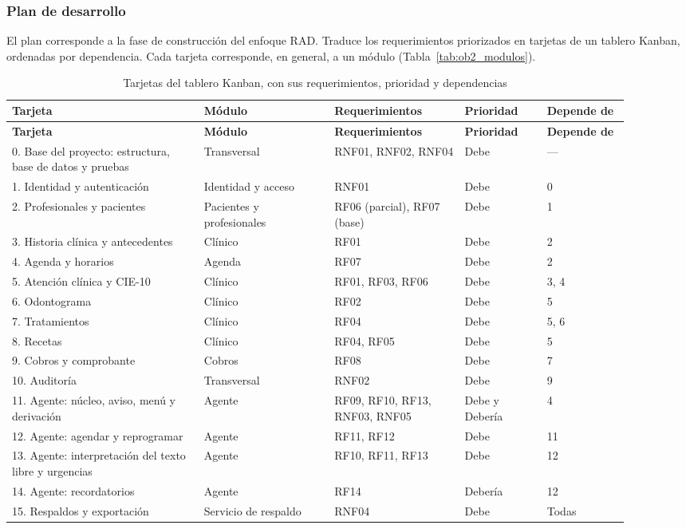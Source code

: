 \subsubsection{Plan de desarrollo}

El plan corresponde a la fase de construcción del enfoque RAD. Traduce los requerimientos priorizados en tarjetas de un tablero Kanban, ordenadas por dependencia. Cada tarjeta corresponde, en general, a un módulo (Tabla~\ref{tab:ob2_modulos}).

\begingroup
\fontsize{9}{11}\selectfont
\renewcommand{\arraystretch}{1.2}
\setlength{\LTpre}{0pt}\setlength{\LTpost}{6pt}
\setlength{\tabcolsep}{4pt}
\begin{longtable}{|p{0.28\linewidth}|p{0.19\linewidth}|p{0.19\linewidth}|p{0.12\linewidth}|p{0.12\linewidth}|}
\caption{Tarjetas del tablero Kanban, con sus requerimientos, prioridad y dependencias}
\label{tab:ob2_tarjetas} \\
\hline
\textbf{Tarjeta} & \textbf{Módulo} & \textbf{Requerimientos} & \textbf{Prioridad} & \textbf{Depende de} \\ \hline
\endfirsthead
\hline
\textbf{Tarjeta} & \textbf{Módulo} & \textbf{Requerimientos} & \textbf{Prioridad} & \textbf{Depende de} \\ \hline
\endhead

0. Base del proyecto: estructura, base de datos y pruebas & Transversal & RNF01, RNF02, RNF04 & Debe & --- \\ \hline
1. Identidad y autenticación & Identidad y acceso & RNF01 & Debe & 0 \\ \hline
2. Profesionales y pacientes & Pacientes y profesionales & RF06 (parcial), RF07 (base) & Debe & 1 \\ \hline
3. Historia clínica y antecedentes & Clínico & RF01 & Debe & 2 \\ \hline
4. Agenda y horarios & Agenda & RF07 & Debe & 2 \\ \hline
5. Atención clínica y CIE-10 & Clínico & RF01, RF03, RF06 & Debe & 3, 4 \\ \hline
6. Odontograma & Clínico & RF02 & Debe & 5 \\ \hline
7. Tratamientos & Clínico & RF04 & Debe & 5, 6 \\ \hline
8. Recetas & Clínico & RF04, RF05 & Debe & 5 \\ \hline
9. Cobros y comprobante & Cobros & RF08 & Debe & 7 \\ \hline
10. Auditoría & Transversal & RNF02 & Debe & 9 \\ \hline
11. Agente: núcleo, aviso, menú y derivación & Agente & RF09, RF10, RF13, RNF03, RNF05 & Debe y Debería & 4 \\ \hline
12. Agente: agendar y reprogramar & Agente & RF11, RF12 & Debe & 11 \\ \hline
13. Agente: interpretación del texto libre y urgencias & Agente & RF10, RF11, RF13 & Debe & 12 \\ \hline
14. Agente: recordatorios & Agente & RF14 & Debería & 12 \\ \hline
15. Respaldos y exportación & Servicio de respaldo & RNF04 & Debe & Todas \\ \hline
\end{longtable}
\endgroup

